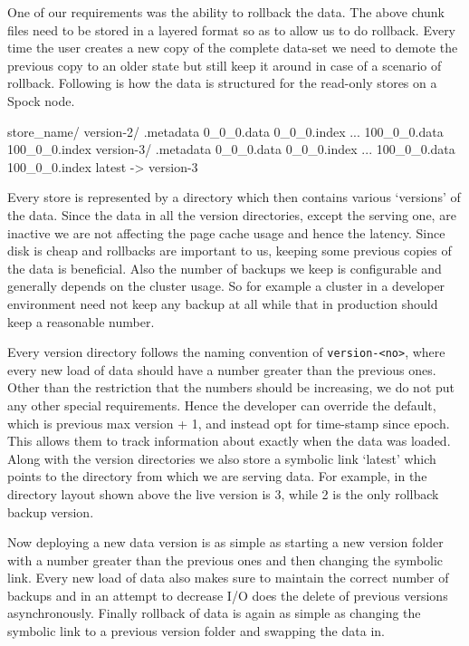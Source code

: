 \documentclass[twocolumn]{article}
\newcommand{\projectname}{Spock}
\begin{document}
One of our requirements was the ability to rollback the data. The above chunk files need to be stored in a layered format so as to allow us to do rollback. Every time the user creates a new copy of the complete data-set we need to demote the previous copy to an older state but still keep it around in case of a scenario of rollback. Following is how the data is structured for the read-only stores on a \projectname{} node. 

\scriptsize
\begin{verbatimtab}
store_name/
  version-2/
    .metadata
    0_0_0.data
    0_0_0.index
    ...
    100_0_0.data
    100_0_0.index
  version-3/
    .metadata
    0_0_0.data
    0_0_0.index
    ...
    100_0_0.data
    100_0_0.index
  latest -> version-3
\end{verbatimtab}
\normalsize

Every store is represented by a directory which then contains various `versions' of the data. Since the data in all the version directories, except the serving one, are inactive we are not affecting the page cache usage and hence the latency. Since disk is cheap and rollbacks are important to us, keeping some previous copies of the data is beneficial. Also the number of backups we keep is configurable and generally depends on the cluster usage. So for example a cluster in a developer environment need not keep any backup at all while that in production should keep a reasonable number.

Every version directory follows the naming convention of \verb=version-<no>=, where every new load of data should have a number greater than the previous ones. Other than the restriction that the numbers should be increasing, we do not put any other special requirements. Hence the developer can override the default, which is previous max version + 1, and instead opt for time-stamp since epoch. This allows them to track information about exactly when the data was loaded. Along with the version directories we also store a symbolic link `latest' which points to the directory from which we are serving data. For example, in the directory layout shown above the live version is 3, while 2 is the only rollback backup version. 

Now deploying a new data version is as simple as starting a new version folder with a number greater than the previous ones and then changing the symbolic link. Every new load of data also makes sure to maintain the correct number of backups and in an attempt to decrease I/O does the delete of previous versions asynchronously. Finally rollback of data is again as simple as changing the symbolic link to a previous version folder and swapping the data in. 
\end{document}
